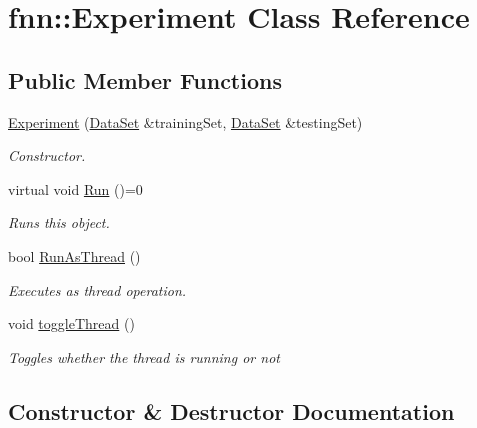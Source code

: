 \hypertarget{classfnn_1_1_experiment}{}\section{fnn\+:\+:Experiment Class Reference}
\label{classfnn_1_1_experiment}
\subsection*{Public Member Functions}
\begin{DoxyCompactItemize}
\item 
\hyperlink{classfnn_1_1_experiment_a25ddc3e38da5a815352cf6263fc7fa5d}{Experiment} (\hyperlink{classfnn_1_1_data_set}{Data\+Set} \&training\+Set, \hyperlink{classfnn_1_1_data_set}{Data\+Set} \&testing\+Set)
\begin{DoxyCompactList}\small\item\em Constructor. \end{DoxyCompactList}\item 
virtual void \hyperlink{classfnn_1_1_experiment_aea6295a63175d6ff096c7a2ab080d0fc}{Run} ()=0
\begin{DoxyCompactList}\small\item\em Runs this object. \end{DoxyCompactList}\item 
bool \hyperlink{classfnn_1_1_experiment_aa60c04e135da7e65d800b8e18ba4411a}{Run\+As\+Thread} ()
\begin{DoxyCompactList}\small\item\em Executes as thread operation. \end{DoxyCompactList}\item 
void \hyperlink{classfnn_1_1_experiment_ace46fbb05c4f306ccd5eff0f62fbd26f}{toggle\+Thread} ()
\begin{DoxyCompactList}\small\item\em Toggles whether the thread is running or not\end{DoxyCompactList}\end{DoxyCompactItemize}


\subsection{Constructor \& Destructor Documentation}
\hypertarget{classfnn_1_1_experiment_a25ddc3e38da5a815352cf6263fc7fa5d}{}

